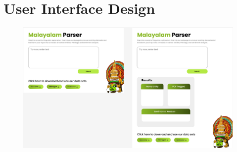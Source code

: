 \documentclass[12pt,a4paper,titlepage]{report}
\begin{document}
	
	
	
	
	\section{User Interface Design}

	\begin{figure}[H]
		\centering
		\includegraphics[width=16cm]{./ui.png}
		
	\end{figure}
	
\end{document}
